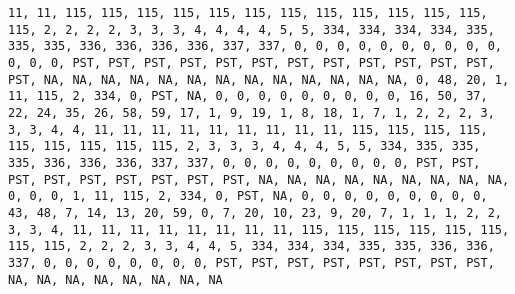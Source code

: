 \documentclass[]{article}
\begin{document}
\begin{verbatim}
11, 11, 115, 115, 115, 115, 115, 115, 115, 115, 115, 115, 115, 115, 115, 2, 2, 2, 2, 3, 3, 3, 4, 4, 4, 4, 5, 5, 334, 334, 334, 334, 335, 335, 335, 336, 336, 336, 336, 337, 337, 0, 0, 0, 0, 0, 0, 0, 0, 0, 0, 0, 0, 0, PST, PST, PST, PST, PST, PST, PST, PST, PST, PST, PST, PST, PST, NA, NA, NA, NA, NA, NA, NA, NA, NA, NA, NA, NA, NA, 0, 48, 20, 1, 11, 115, 2, 334, 0, PST, NA, 0, 0, 0, 0, 0, 0, 0, 0, 0, 16, 50, 37, 22, 24, 35, 26, 58, 59, 17, 1, 9, 19, 1, 8, 18, 1, 7, 1, 2, 2, 2, 3, 3, 3, 4, 4, 11, 11, 11, 11, 11, 11, 11, 11, 11, 115, 115, 115, 115, 115, 115, 115, 115, 115, 2, 3, 3, 3, 4, 4, 4, 5, 5, 334, 335, 335, 335, 336, 336, 336, 337, 337, 0, 0, 0, 0, 0, 0, 0, 0, 0, PST, PST, PST, PST, PST, PST, PST, PST, PST, NA, NA, NA, NA, NA, NA, NA, NA, NA, 0, 0, 0, 1, 11, 115, 2, 334, 0, PST, NA, 0, 0, 0, 0, 0, 0, 0, 0, 0, 43, 48, 7, 14, 13, 20, 59, 0, 7, 20, 10, 23, 9, 20, 7, 1, 1, 1, 2, 2, 3, 3, 4, 11, 11, 11, 11, 11, 11, 11, 11, 115, 115, 115, 115, 115, 115, 115, 115, 2, 2, 2, 3, 3, 4, 4, 5, 334, 334, 334, 335, 335, 336, 336, 337, 0, 0, 0, 0, 0, 0, 0, 0, PST, PST, PST, PST, PST, PST, PST, PST, NA, NA, NA, NA, NA, NA, NA, NA

\end{verbatim}
\end{document}
